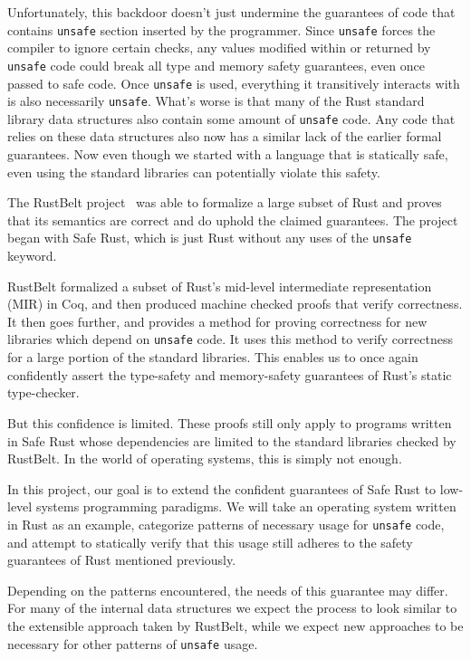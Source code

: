 \documentclass[12pt]{article}
\begin{document}
Unfortunately, this backdoor doesn't just undermine the guarantees of code that contains \texttt{unsafe} section inserted by the programmer. Since \texttt{unsafe} forces the compiler to ignore certain checks, any values modified within or returned by \texttt{unsafe} code could break all type and memory safety guarantees, even once passed to safe code. Once \texttt{unsafe} is used, everything it transitively interacts with is also necessarily \texttt{unsafe}. What's worse is that many of the Rust standard library data structures also contain some amount of \texttt{unsafe} code. Any code that relies on these data structures also now has a similar lack of the earlier formal guarantees. Now even though we started with a language that is statically safe, even using the standard libraries can potentially violate this safety.

The RustBelt project~\cite{jung2017rustbelt} was able to formalize a large subset of Rust and proves that its semantics are correct and do uphold the claimed guarantees. The project began with Safe Rust, which is just Rust without any uses of the \texttt{unsafe} keyword. 

RustBelt formalized a subset of Rust's mid-level intermediate representation (MIR) in Coq, and then produced machine checked proofs that verify correctness. It then goes further, and provides a method for proving correctness for new libraries which depend on \texttt{unsafe} code. It uses this method to verify correctness for a large portion of the standard libraries. This enables us to once again confidently assert the type-safety and memory-safety guarantees of Rust's static type-checker.

But this confidence is limited. These proofs still only apply to programs written in Safe Rust whose dependencies are limited to the standard libraries checked by RustBelt. In the world of operating systems, this is simply not enough. %

In this project, our goal is to extend the confident guarantees of Safe Rust to low-level systems programming paradigms. We will take an operating system written in Rust as an example, categorize patterns of necessary usage for \texttt{unsafe} code, and attempt to statically verify that this usage still adheres to the safety guarantees of Rust mentioned previously. 

Depending on the patterns encountered, the needs of this guarantee may differ. For many of the internal data structures we expect the process to look similar to the extensible approach taken by RustBelt, while we expect new approaches to be necessary for other patterns of \texttt{unsafe} usage.
\end{document}
